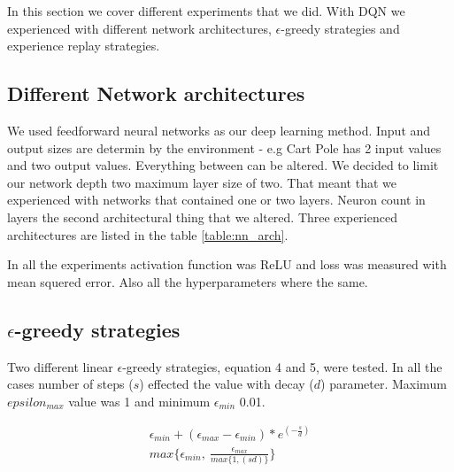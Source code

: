 In this section we cover different experiments that we did. With DQN we experienced with different network architectures, $\epsilon$-greedy strategies and experience replay strategies.

\subsection{Different Network architectures}
We used feedforward neural networks as our deep learning method. Input and output sizes are determin by the environment - e.g Cart Pole has 2 input values and two output values. Everything between can be altered. We decided to limit our network depth two maximum layer size of two. That meant that we experienced with networks that contained one or two layers. Neuron count in layers the second architectural thing that we altered. Three experienced architectures are listed in the table \ref{table:nn_arch}.
\begin{table}[H]
    \caption{Different network architectures used with DQN.}
    \centering
    \label{table:nn_arch}
\end{table}
In all the experiments activation function was ReLU and loss was measured with mean squered error. Also all the hyperparameters where the same.

\subsection{$\epsilon$-greedy strategies}
Two different linear $\epsilon$-greedy strategies, equation 4 and 5, were tested. In all the cases number of steps ($s$) effected the value with decay ($d$) parameter. Maximum $epsilon_{max}$ value was 1 and minimum $\epsilon_{min}$ 0.01.

\begin{align}
    \epsilon_{min} + (\epsilon_{max} - \epsilon_{min}) * e^{(-\frac{s}{d})} \\
    max \{\epsilon_{min},\:\frac{\epsilon_{max}}{max \{1, (sd)\}} \}
\end{align}


